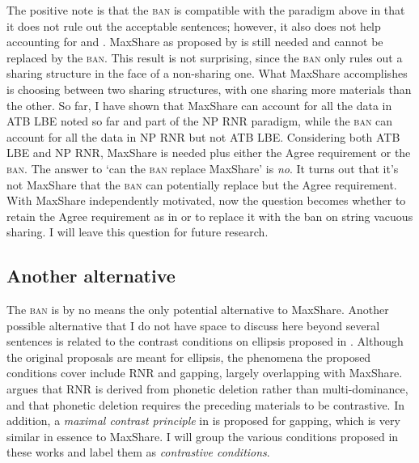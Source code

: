 \documentclass[output=paper]{langscibook}
\begin{document}
\ea{}
	\label{shenex34}
	\z 
\z 
The positive note is that the \textsc{ban} is compatible with the paradigm above in that it does not rule out the acceptable sentences; however, it also does not help accounting for  and . MaxShare as proposed by \citet{Citko:2006} is still needed and cannot be replaced by the \textsc{ban}. This result is not surprising, since the \textsc{ban} only rules out a sharing structure in the face of a non-sharing one. What MaxShare accomplishes is choosing between two sharing structures, with one sharing more materials than the other. So far, I have shown that MaxShare can account for all the data in ATB LBE noted so far and part of the NP RNR paradigm, while the \textsc{ban} can account for all the data in NP RNR but not ATB LBE. Considering both ATB LBE and NP RNR, MaxShare is needed plus either the Agree requirement or the \textsc{ban}. The answer to `can the \textsc{ban} replace MaxShare' is \emph{no}. It turns out that it's not MaxShare that the \textsc{ban} can potentially replace but the Agree requirement. With MaxShare independently motivated, now the question becomes whether to retain the Agree requirement as in \citet{Shen:2018a} or to replace it with the ban on string vacuous sharing. I will leave this question for future research.

\subsection{Another alternative} 

The \textsc{ban} is by no means the only potential alternative to MaxShare. Another possible alternative that I do not have space to discuss here beyond several sentences is related to the contrast conditions on ellipsis proposed in \citet{Hartmann:2000, Hartmann:2003, Fery:2005a}. Although the original proposals are meant for ellipsis, the phenomena the proposed conditions cover include RNR and gapping, largely overlapping with MaxShare. \citet{Hartmann:2000, Hartmann:2003} argues that RNR is derived from phonetic deletion rather than multi-dominance, and that phonetic deletion requires the preceding materials to be contrastive. In addition, a \textit{maximal contrast principle} in  is proposed for gapping, which is very similar in essence to MaxShare. I will group the various conditions proposed in these works and label them as \textit{contrastive conditions}.
\end{document}
